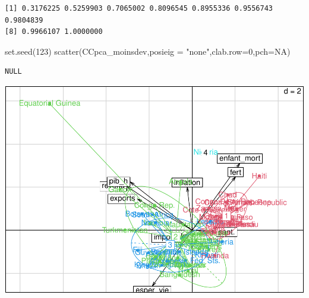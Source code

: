 \documentclass[
]{article}
\newenvironment{Shaded}{}{}
\newcommand{\AttributeTok}[1]{#1}
\newcommand{\ConstantTok}[1]{#1}
\newcommand{\DecValTok}[1]{#1}
\newcommand{\FunctionTok}[1]{#1}
\newcommand{\NormalTok}[1]{#1}
\newcommand{\SpecialCharTok}[1]{\textcolor[rgb]{0.00,0.50,0.50}{#1}}
\newcommand{\StringTok}[1]{\textcolor[rgb]{0.00,0.50,0.50}{#1}}
\begin{document}
\begin{verbatim}
[1] 0.3176225 0.5259903 0.7065002 0.8096545 0.8955336 0.9556743 0.9804839
[8] 0.9966107 1.0000000
\end{verbatim}

\begin{Shaded}
\begin{Highlighting}[]
\FunctionTok{set.seed}\NormalTok{(}\DecValTok{123}\NormalTok{)}
\FunctionTok{scatter}\NormalTok{(CCpca\_moinsdev,}\AttributeTok{posieig =} \StringTok{"none"}\NormalTok{,}\AttributeTok{clab.row=}\DecValTok{0}\NormalTok{,}\AttributeTok{pch=}\ConstantTok{NA}\NormalTok{)}
\end{Highlighting}
\end{Shaded}

\begin{verbatim}
NULL
\end{verbatim}

\begin{Shaded}
\end{Shaded}

\includegraphics{Projet_files/figure-latex/unnamed-chunk-37-1.pdf}
\end{document}
